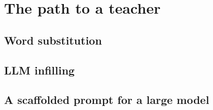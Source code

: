 \chapter{The path to a teacher}\label{ch:path}

\section{Word substitution}

\section{LLM infilling}

\section{A scaffolded prompt for a large model}
